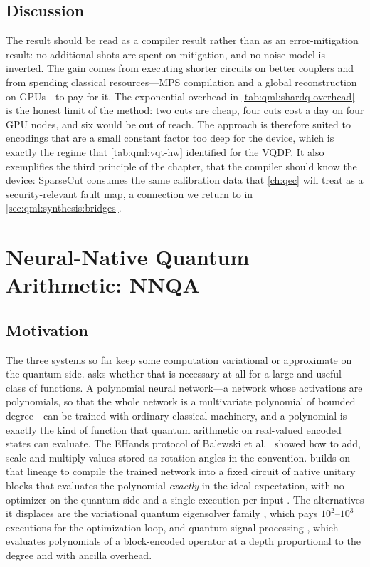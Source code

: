 \subsection{Discussion}\label{sec:qml:shardq:discussion}

The result should be read as a compiler result rather than as an error-mitigation result: no additional shots are spent on mitigation, and no noise model is inverted. The gain comes from executing shorter circuits on better couplers and from spending classical resources---MPS compilation and a global reconstruction on GPUs---to pay for it. The exponential overhead in \cref{tab:qml:shardq-overhead} is the honest limit of the method: two cuts are cheap, four cuts cost a day on four GPU nodes, and six would be out of reach. The approach is therefore suited to encodings that are a small constant factor too deep for the device, which is exactly the regime that \cref{tab:qml:vqt-hw} identified for the VQDP. It also exemplifies the third principle of the chapter, that the compiler should know the device: SparseCut consumes the same calibration data that \cref{ch:qec} will treat as a security-relevant fault map, a connection we return to in \cref{sec:qml:synthesis:bridges}.

\section{Neural-Native Quantum Arithmetic: NNQA}\label{sec:qml:nnqa}

\subsection{Motivation}\label{sec:qml:nnqa:motivation}

The three systems so far keep some computation variational or approximate on the quantum side. \nnqa{} asks whether that is necessary at all for a large and useful class of functions. A polynomial neural network---a network whose activations are polynomials, so that the whole network is a multivariate polynomial of bounded degree---can be trained with ordinary classical machinery, and a polynomial is exactly the kind of function that quantum arithmetic on real-valued encoded states can evaluate. The EHands protocol of Balewski et al.~\cite{balewski2025ehands} showed how to add, scale and multiply values stored as rotation angles in the \qcrank{} convention. \nnqa{} builds on that lineage to compile the trained network into a fixed circuit of native unitary blocks that evaluates the polynomial \emph{exactly} in the ideal expectation, with no optimizer on the quantum side and a single execution per input \cite{guo2026nnqa}. The alternatives it displaces are the variational quantum eigensolver family \cite{peruzzo2014vqe,cerezo2021vqa}, which pays $10^2$--$10^3$ executions for the optimization loop, and quantum signal processing \cite{low2017qsp,gilyen2019qsvt}, which evaluates polynomials of a block-encoded operator at a depth proportional to the degree and with ancilla overhead.

